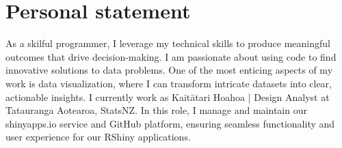 \section{Personal statement}
As a skilful programmer, I leverage my technical skills to produce meaningful outcomes that drive decision-making. 
I am passionate about using code to find innovative solutions to data problems.
One of the most enticing aspects of my work is data visualization, where I can transform intricate datasets into clear, actionable insights. 
I currently work as Kaitātari Hoahoa | Design Analyst at Tatauranga Aotearoa, StatsNZ. In this role, I manage and maintain our shinyapps.io service and GitHub platform, ensuring seamless functionality and user experience for our RShiny applications.

